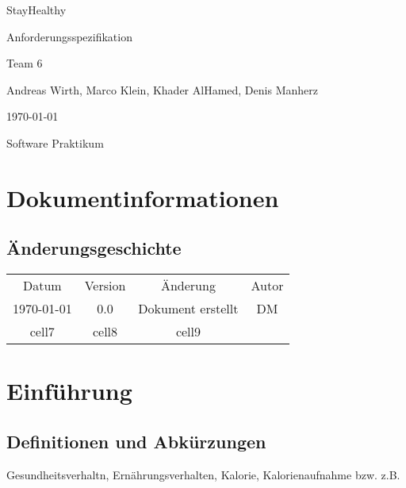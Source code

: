 \documentclass[12pt,a4paper,onecolumn]{article}
\newcommand\titleofdoc{StayHealthy} %
\newcommand\GroupName{Team 6} %
\begin{document}
\begin{titlepage}
   \begin{center}
        \vspace*{4cm} %

        \Huge{\titleofdoc} 

        \vspace{0.5cm}
        \LARGE{Anforderungsspezifikation}
            
        \vspace{3 cm}
        \Large{\GroupName}
       
        \vspace{0.25cm}
        \large{Andreas Wirth, Marco Klein, Khader AlHamed, Denis Manherz}
       
        \vspace{3 cm}
        \Large{\today}%
        
        \vspace{0.25 cm}
        \Large{Software Praktikum}
       

       \vfill
    \end{center}
\end{titlepage}
\setcounter{page}{2}
\tableofcontents
\newpage

\section{Dokumentinformationen} 
\subsection{Änderungsgeschichte}
\begin{center}
\begin{tabular}{ |c|c|c|c| } 
 \hline
 Datum & Version & Änderung & Autor\\ 
 \today & 0.0 & Dokument erstellt & DM \\ 
 cell7 & cell8 & cell9 \\ 
 \hline
\end{tabular}
\end{center}

\section{Einführung}
\subsection{Definitionen und Abkürzungen}
Gesundheitsverhaltn, Ernährungsverhalten, Kalorie, Kalorienaufnahme
bzw. z.B. 
\end{document}
